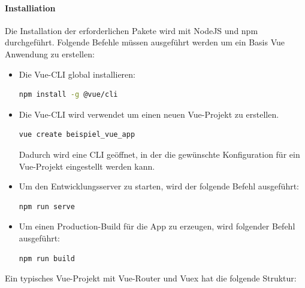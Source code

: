 \paragraph{Installiation}
Die Installation der erforderlichen Pakete wird mit NodeJS und npm durchgeführt. Folgende Befehle müssen ausgeführt werden um ein Basis Vue Anwendung zu erstellen:
\begin{itemize}
  \item Die Vue-CLI global installieren:
  \begin{lstlisting}[language=bash]
    npm install -g @vue/cli
  \end{lstlisting}
  \item Die Vue-\gls{CLI} wird verwendet um einen neuen Vue-Projekt zu erstellen.
  \begin{lstlisting}[language=bash]
    vue create beispiel_vue_app
  \end{lstlisting}
  Dadurch wird eine CLI geöffnet, in der die gewünschte Konfiguration für ein Vue-Projekt eingestellt werden kann.
  \item Um den Entwicklungsserver zu starten, wird der folgende Befehl ausgeführt:
  \begin{lstlisting}[language=bash]
    npm run serve
  \end{lstlisting}
  \item Um einen Production-Build für die App zu erzeugen, wird folgender Befehl ausgeführt:
  \begin{lstlisting}[language=bash]
    npm run build
  \end{lstlisting} 
\end{itemize} 

Ein typisches Vue-Projekt mit Vue-Router und Vuex hat die folgende Struktur:

